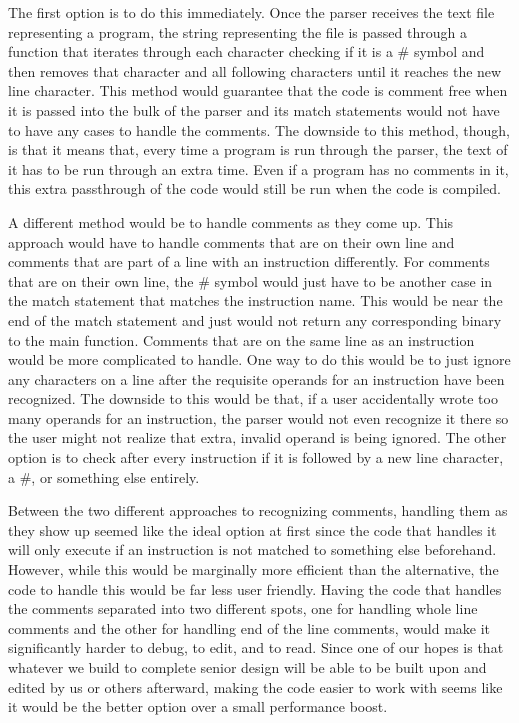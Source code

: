 \documentclass[
    parskip=half,
    fontsize=12pt,
    titlepage=firstiscover,
    toc=bibliography,
    numbers=endperiod
]{scrartcl}
\begin{document}
The first option is to do this immediately. Once the parser receives the
text file representing a program, the string representing the file is
passed through a function that iterates through each character checking
if it is a \# symbol and then removes that character and all following
characters until it reaches the new line character. This method would
guarantee that the code is comment free when it is passed into the bulk
of the parser and its match statements would not have to have any cases
to handle the comments. The downside to this method, though, is that it
means that, every time a program is run through the parser, the text of
it has to be run through an extra time. Even if a program has no
comments in it, this extra passthrough of the code would still be run
when the code is compiled.

A different method would be to handle comments as they come up. This
approach would have to handle comments that are on their own line and
comments that are part of a line with an instruction differently. For
comments that are on their own line, the \# symbol would just have to be
another case in the match statement that matches the instruction name.
This would be near the end of the match statement and just would not
return any corresponding binary to the main function. Comments that are
on the same line as an instruction would be more complicated to handle.
One way to do this would be to just ignore any characters on a line
after the requisite operands for an instruction have been recognized.
The downside to this would be that, if a user accidentally wrote too
many operands for an instruction, the parser would not even recognize it
there so the user might not realize that extra, invalid operand is being
ignored. The other option is to check after every instruction if it is
followed by a new line character, a \#, or something else entirely.

Between the two different approaches to recognizing comments, handling
them as they show up seemed like the ideal option at first since the
code that handles it will only execute if an instruction is not matched
to something else beforehand. However, while this would be marginally
more efficient than the alternative, the code to handle this would be
far less user friendly. Having the code that handles the comments
separated into two different spots, one for handling whole line comments
and the other for handling end of the line comments, would make it
significantly harder to debug, to edit, and to read. Since one of our
hopes is that whatever we build to complete senior design will be able
to be built upon and edited by us or others afterward, making the code
easier to work with seems like it would be the better option over a
small performance boost.
\end{document}
